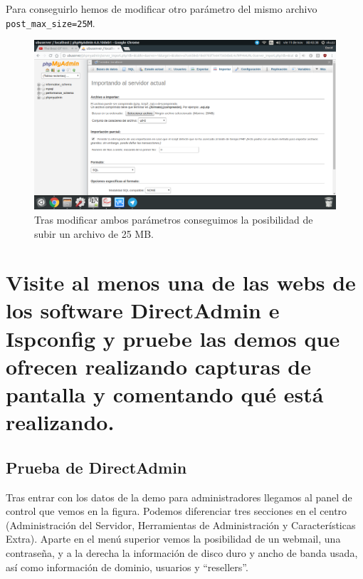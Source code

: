 \begin{flushleft}
Para conseguirlo hemos de modificar otro parámetro del mismo archivo \verb|post_max_size=25M|. \cite{c13b}
\begin{figure}[H]
	\centering
	\includegraphics[scale=0.3]{phpmyadmin5.png}
	\caption{Tras modificar ambos parámetros conseguimos la posibilidad de subir un archivo de 25 MB.}
\end{figure}

\section{Visite al menos una de las webs de los software DirectAdmin e Ispconfig y pruebe las demos que ofrecen realizando capturas de pantalla y comentando qué está realizando.}

\subsection{Prueba de DirectAdmin}
Tras entrar con los datos de la demo para administradores llegamos al panel de control que vemos en la figura. Podemos diferenciar tres secciones en el centro (Administración del Servidor, Herramientas de Administración y Características Extra). Aparte en el menú superior vemos la posibilidad de un webmail, una contraseña, y a la derecha la información de disco duro y ancho de banda usada, así como información de dominio, usuarios y ``resellers''.


\end{flushleft}
